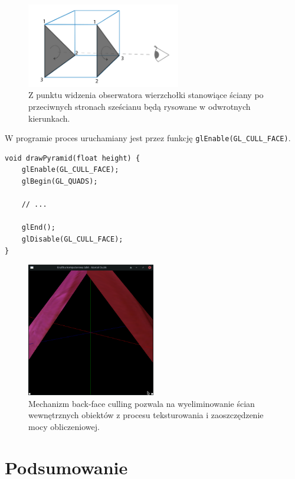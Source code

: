 \documentclass[a4paper]{article}
\begin{document}
\begin{figure}[H]
    \centering
    \includegraphics[width=0.6\textwidth]{draworder}
    \caption{Z punktu widzenia obserwatora wierzchołki stanowiące ściany po
        przeciwnych stronach sześcianu będą rysowane w odwrotnych kierunkach.}
\end{figure}

W programie proces uruchamiany jest przez funkcję \verb|glEnable(GL_CULL_FACE)|.

\begin{verbatim}
void drawPyramid(float height) {
    glEnable(GL_CULL_FACE);
    glBegin(GL_QUADS);

    // ...

    glEnd();
    glDisable(GL_CULL_FACE);
}
\end{verbatim}

\begin{figure}[H]
    \centering
    \includegraphics[width=0.5\textwidth]{backfaceculling}
    \caption{Mechanizm back-face culling pozwala na wyeliminowanie ścian
        wewnętrznych obiektów z procesu teksturowania i zaoszczędzenie mocy
        obliczeniowej.}
\end{figure}


\section{Podsumowanie}
\end{document}
